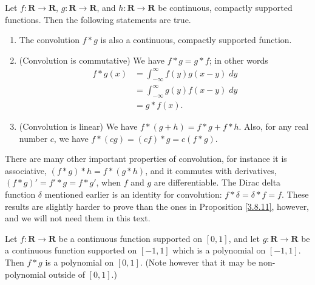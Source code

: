 \begin{proposition}\label{3.8.11}
    Let \(f : \mathbf{R} \to \mathbf{R}\), \(g : \mathbf{R} \to \mathbf{R}\), and \(h : \mathbf{R} \to \mathbf{R}\) be continuous, compactly supported functions.
    Then the following statements are true.
    \begin{enumerate}
        \item The convolution \(f * g\) is also a continuous, compactly supported function.
        \item (Convolution is commutative)
              We have \(f * g = g * f\);
              in other words
              \begin{align*}
                  f * g(x) & = \int_{-\infty}^\infty f(y) g(x - y) \; dy \\
                           & = \int_{-\infty}^\infty g(y) f(x - y) \; dy \\
                           & = g * f(x).
              \end{align*}
        \item (Convolution is linear)
              We have \(f * (g + h) = f * g + f * h\).
              Also, for any real number \(c\), we have \(f * (cg) = (cf) * g = c(f * g)\).
    \end{enumerate}
\end{proposition}

\begin{remark}\label{3.8.12}
    There are many other important properties of convolution, for instance it is associative, \((f * g) * h = f * (g * h)\), and it commutes with derivatives, \((f * g)' = f' * g = f * g'\), when \(f\) and \(g\) are differentiable.
    The Dirac delta function \(\delta\) mentioned earlier is an identity for convolution:
    \(f * \delta = \delta * f = f\).
    These results are slightly harder to prove than the ones in Proposition \ref{3.8.11}, however, and we will not need them in this text.
\end{remark}

\begin{lemma}\label{3.8.13}
    Let \(f : \mathbf{R} \to \mathbf{R}\) be a continuous function supported on \([0, 1]\), and let \(g : \mathbf{R} \to \mathbf{R}\) be a continuous function supported on \([-1, 1]\) which is a polynomial on \([-1, 1]\).
    Then \(f * g\) is a polynomial on \([0, 1]\).
    (Note however that it may be non-polynomial outside of \([0, 1].\))
\end{lemma}

